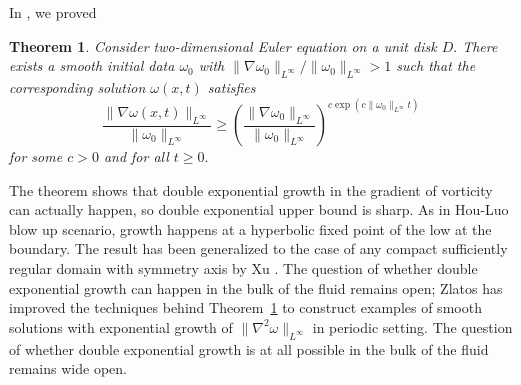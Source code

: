 \documentclass[reqno,centertags, 11pt]{amsart}
\newtheorem{theorem}{Theorem}[section]
\begin{document}
In \cite{KS}, we proved
\begin{theorem}\label{mainthm}
Consider two-dimensional Euler equation on a unit disk $D.$ There exists a smooth initial data $\omega_0$ with
$\|\nabla \omega_0\|_{L^\infty}/\|\omega_0\|_{L^\infty} >1$ such that the corresponding
solution $\omega(x,t)$ satisfies
\begin{equation}\label{main1}
\frac{\|\nabla \omega(x,t)\|_{L^\infty}}{\|\omega_0\|_{L^\infty}}
\geq \left( \frac{\|\nabla \omega_0\|_{L^\infty}}{\|\omega_0\|_{L^\infty}}\right)^{c\exp(c\|\omega_0\|_{L^\infty}t)}
\end{equation}
for some $c>0$ and for all $t \geq 0.$
\end{theorem}
The theorem shows that double exponential growth in the gradient of vorticity can actually happen, so double exponential
upper bound is sharp. As in Hou-Luo blow up scenario, growth happens at a hyperbolic fixed point of the low at the boundary.
The result has been generalized to the case of any compact sufficiently regular domain with
symmetry axis by Xu \cite{Xu}. The question of whether double exponential growth can happen in the bulk of the fluid remains open;
Zlatos \cite{Z3} has improved the techniques behind Theorem~\ref{mainthm} to construct examples of smooth solutions
with exponential growth of $\|\nabla^2\omega\|_{L^\infty}$ in periodic setting. The question of whether double exponential growth
is at all possible in the bulk of the fluid remains wide open.
\end{document}
